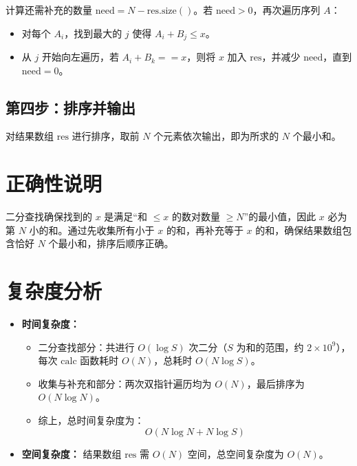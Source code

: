 \documentclass[11pt,a4paper,twocolumn]{ctexart}  %
\begin{document}
计算还需补充的数量 $\mathrm{need} = N - \mathrm{res.size()}$。若 $\mathrm{need} > 0$，再次遍历序列 $A$：
\begin{itemize}
    \item 对每个 $A_i$，找到最大的 $j$ 使得 $A_i + B_j \leq x$。
    \item 从 $j$ 开始向左遍历，若 $A_i + B_k == x$，则将 $x$ 加入 $\mathrm{res}$，并减少 $\mathrm{need}$，直到 $\mathrm{need} = 0$。
\end{itemize}

\subsection*{第四步：排序并输出}

对结果数组 $\mathrm{res}$ 进行排序，取前 $N$ 个元素依次输出，即为所求的 $N$ 个最小和。

\section*{正确性说明}

二分查找确保找到的 $x$ 是满足“和 $\leq x$ 的数对数量 $\geq N$”的最小值，因此 $x$ 必为第 $N$ 小的和。通过先收集所有小于 $x$ 的和，再补充等于 $x$ 的和，确保结果数组包含恰好 $N$ 个最小和，排序后顺序正确。

\section*{复杂度分析}

\begin{itemize}
    \item \textbf{时间复杂度：}
    \begin{itemize}
        \item 二分查找部分：共进行 $O(\log S)$ 次二分（$S$ 为和的范围，约 $2 \times 10^9$），每次 $\mathrm{calc}$ 函数耗时 $O(N)$，总耗时 $O(N \log S)$。
        \item 收集与补充和部分：两次双指针遍历均为 $O(N)$，最后排序为 $O(N \log N)$。
        \item 综上，总时间复杂度为：
        \[
            O(N \log N + N \log S)
        \]
    \end{itemize}
    \item \textbf{空间复杂度：} 结果数组 $\mathrm{res}$ 需 $O(N)$ 空间，总空间复杂度为 $O(N)$。
\end{itemize}
\end{document}
